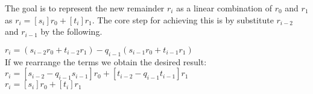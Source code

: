 \noindent
The goal is to represent the new remainder $r_i$ as a linear combination of $r_0$ and $r_1$ as $r_i = [s_i]r_0 +[t_i]r_1$. The core step for achieving this is by substitute $r_{i-2}$ and $r_{i-1}$ by the following.

\noindent
\begin{infobox}
$r_i = (s_{i-2}r_0+t_{i-2}r_1)-q_{i-1}(s_{i-1}r_0+t_{i-1}r_1)$\\
If we rearrange the terms we obtain the desired result:\\
$r_i = [s_{i-2}-q_{i-1}s_{i-1}]r_0 +[t_{i-2}-q_{i-1}t_{i-1}]r_1$\\
$r_i = [s_i]r_0 +[t_i]r_1$
\end{infobox}